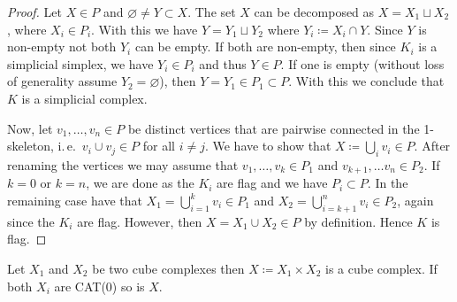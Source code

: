 \begin{proof}
  Let \(X \in P\) and \(\varnothing \neq Y \subset X\). The set \(X\) can be decomposed as \(X = X_1 \sqcup X_2\), where \(X_i \in P_i\). With this we have \(Y = Y_1 \sqcup Y_2\) where \(Y_i \coloneqq X_i \cap Y\). Since \(Y\) is non-empty not both \(Y_i\) can be empty. If both are non-empty, then since \(K_i\) is a simplicial simplex, we have \(Y_i \in P_i\) and thus \(Y \in P\). If one is empty (without loss of generality assume \(Y_2 = \varnothing\)), then \(Y = Y_1 \in P_1 \subset P\). With this we conclude that \(K\) is a simplicial complex.

  Now, let \(v_1, \dots, v_n \in P\) be distinct vertices that are pairwise connected in the 1-skeleton, i.\,e.\ \(v_i \cup v_j \in P\) for all \(i \neq j\). We have to show that \(X \coloneqq \bigcup_i v_i \in P\). After renaming the vertices we may assume that \(v_1, \dots, v_k \in P_1\) and \(v_{k+1}, \dots v_{n} \in P_2\). If \(k=0\) or \(k=n\), we are done as the \(K_i\) are flag and we have \(P_i \subset P\). In the remaining case have that \(X_1 = \bigcup_{i=1}^kv_i \in P_1\) and \(X_2 = \bigcup_{i=k+1}^n v_i \in P_2\), again since the \(K_i\) are flag. However, then \(X = X_1 \cup X_2 \in P\) by definition. Hence \(K\) is flag.
\end{proof}

\begin{prop}
  \label{prop:product-cat}
  Let \(X_1\) and \(X_2\) be two cube complexes then \(X \coloneqq X_1 \times X_2\) is a cube complex. If both \(X_i\) are CAT(0) so is \(X\).
\end{prop}

